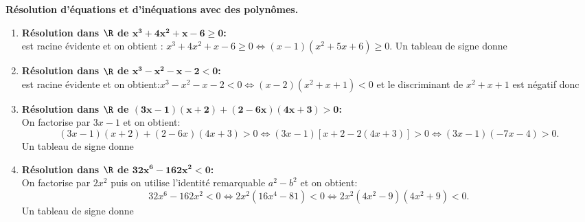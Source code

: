 \begin{correction}  \; \textbf{R\'esolution d'\'equations et d'in\'equations avec des polyn\^{o}mes.}
\begin{enumerate}
\item \textbf{R\'esolution dans $\mathbf{\R}$ de $\mathbf{x^3+4x^2+x-6\geq 0 }$:}\\
 est racine \'evidente et on obtient : $x^3+4x^2+x-6\geq 0\Leftrightarrow (x-1)(x^2+5x+6)\geq 0$. Un tableau de signe donne 
\item \textbf{R\'esolution dans $\mathbf{\R}$ de $\mathbf{x^3-x^2-x-2<0}$:}\\
 est racine \'evidente et on obtient:$x^3-x^2-x-2<0\Leftrightarrow (x-2)(x^2+x+1)<0$ et le discriminant de $x^2+x+1$ est n\'egatif donc 
\item \textbf{R\'esolution dans $\mathbf{\R}$ de $\mathbf{(3x-1)(x+2)+(2-6x)(4x+3)>0}$:}\\
\noindent On factorise par $3x-1$ et on obtient: 
$$(3x-1)(x+2)+(2-6x)(4x+3)>0\Leftrightarrow (3x-1)\left\lbrack x+2-2(4x+3)\right\rbrack >0\Leftrightarrow (3x-1)(-7x-4)>0.$$ 
Un tableau de signe donne 
\item \textbf{R\'esolution dans $\mathbf{\R}$ de $\mathbf{32x^6-162x^2<0}$:}\\
\noindent On factorise par $2x^2$ puis on utilise l'identit\'e remarquable $a^2-b^2$ et on obtient: 
$$32x^6-162x^2<0\Leftrightarrow 2x^2(16x^4-81)<0\Leftrightarrow 2x^2( 4x^2-9 )(4x^2+9)<0.$$
Un tableau de signe donne 

\end{enumerate}
\end{correction}
